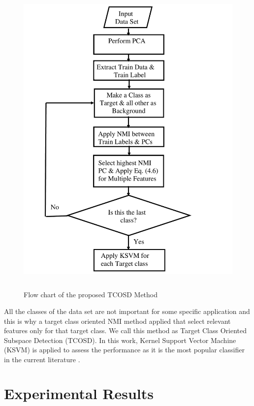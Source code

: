 \documentclass[document.tex]{subfiles}
\begin{document}
\begin{figure}[H]
	\begin{center}
		\includegraphics[height=16.0cm]{imgs/flow.pdf}
	\end{center}
	\caption{Flow chart of the proposed TCOSD Method}
	\label{fig:Flow chart of the proposed TCOSD Method}
\end{figure}

\noindent All the classes of the data set are not important for some specific application and this is why a target class oriented NMI method applied that select relevant features only for that target class. We call this method as Target Class Oriented Subspace Detection (TCOSD). In this work, Kernel Support Vector Machine (KSVM) is applied to assess the performance as it is the most popular classifier in the current literature \cite{11}. 

\section{Experimental Results}
\end{document}
